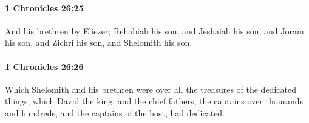 		\paragraph{1 Chronicles 26:25} %
			\label{1CHRONICLES-26-25}

			And his brethren by Eliezer; Rehabiah his son, and Jeshaiah his son, and Joram his son, and Zichri his son, and Shelomith his son.


		\paragraph{1 Chronicles 26:26} %
			\label{1CHRONICLES-26-26}

			Which Shelomith and his brethren were over all the treasures of the dedicated things, which David the king, and the chief fathers, the captains over thousands and hundreds, and the captains of the host, had dedicated.

